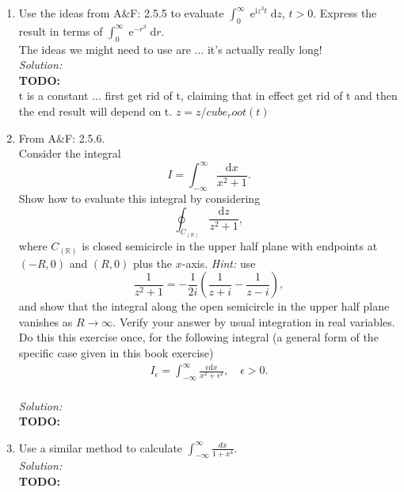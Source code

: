 \documentclass[10pt]{amsart}
\newcommand{\D}{\mathrm{d}}
\newcommand{\I}{\mathrm{i}}
\DeclareMathOperator{\E}{e}
\theoremstyle{nonumberplain}
\begin{document}
\begin{enumerate}[label={\bf {\arabic*}:}]
\item Use the ideas from A\&F: 2.5.5 to evaluate $\int_0^\infty \E^{\I
    z^3 t} \D z$, $t > 0$.  Express the result in terms of $\int_0^\infty \E^{-
    r^3} \D r$. \\
The ideas we might need to use are ... it's actually really long! \\
\textit{Solution:}\\ 
\textbf{TODO:} \\
t is a constant ... first get rid of t, claiming that in effect get rid of t and then the end result will depend on t. $z = z/cube_root(t)$

\item From A\&F: 2.5.6. \\
Consider the integral $$I = \int_{-\infty}^{\infty} \frac{\D x}{x^2 + 1}.$$
Show how to evaluate this integral by considering
$$\oint_{C_{(\mathbb R)}} \frac{\D z}{z^2 + 1},$$
where $C_{(\mathbb R)}$ is closed semicircle in the upper half plane with endpoints at $(-R, 0)$ and $(R, 0)$ plus the $x$-axis.
\textit{Hint:} use
$$\frac{1}{z^2 + 1} = -\frac{1}{2i}\left(\frac{1}{z + i} - \frac{1}{z - i}\right),$$
and show that the integral along the open semicircle in the upper half plane vanishes as $R \rightarrow \infty$.
Verify your answer by usual integration in real variables. \\

\noindent
Do this this exercise once, for the following integral (a general form of the specific case given in this book exercise)
  \begin{align*}
    I_\epsilon = \int_{-\infty}^\infty \frac{\epsilon \D x}{x^2 +
    \epsilon^2}, \quad \epsilon > 0.
  \end{align*}\\
\textit{Solution:}\\
\textbf{TODO:} \\


\item Use a similar method to calculate
  $\int_{-\infty}^{\infty} \frac{d x}{1+x^4}$. \\
\textit{Solution:}\\
\textbf{TODO:}
\\


\end{enumerate}
\end{document}
